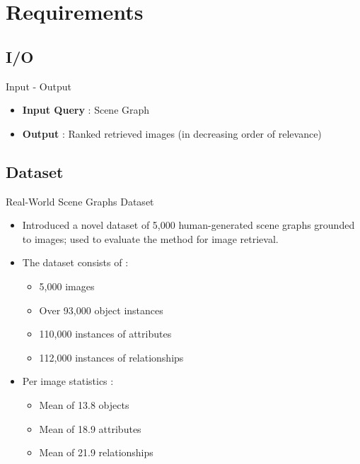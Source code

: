 \documentclass{IFES-beamer}
\begin{document}
\section{Requirements}
    \subsection{I/O}
        \begin{frame}{Input - Output}
                \begin{itemize}
                    \item \textbf{Input Query} :  Scene Graph \vspace{5mm}
                    \item \textbf{Output} : Ranked retrieved images (in decreasing order of relevance)
                \end{itemize}
        \end{frame}
    
    \subsection{Dataset}
        \begin{frame}{Real-World Scene Graphs Dataset}
            \begin{itemize}
                \item Introduced a novel dataset of 5,000 human-generated scene graphs grounded to images; used to evaluate the method for image retrieval.
                \item The dataset consists of :
                    \begin{itemize}
                        \item 5,000 images
                        \item Over 93,000 object instances
                        \item  110,000 instances of attributes
                        \item 112,000 instances of relationships
                    \end{itemize}
                \item Per image statistics :
                    \begin{itemize}
                        \item Mean of 13.8 objects
                        \item Mean of 18.9 attributes
                        \item Mean of 21.9 relationships
                    \end{itemize}
            \end{itemize}
        \end{frame}
        
\end{document}
